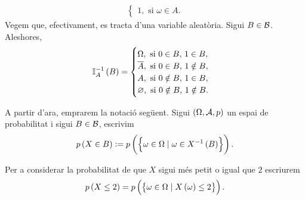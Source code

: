 \begin{example}
\begin{enumerate}[1.]
\begin{align*}
\begin{cases}
                    1, \text{ si } \omega\in A.
                \end{cases}
            \end{align*}
            Vegem que, efectivament, es tracta d'una variable aleatòria. Sigui $B\in\mathcal{B}$. Aleshores,
            \[
		    \mathbb{I}_A^{-1}\left( B\right)=\begin{cases}
                    \Omega, \text{ si } 0\in B,\, 1\in B,\\
                    \overline{A}, \text{ si } 0\in B,\, 1\notin B,\\
                    A, \text{ si } 0\notin B,\, 1\in B,\\
                    \varnothing, \text{ si } 0\notin B,\, 1\notin B.
                \end{cases}
            \]
    \end{enumerate}
\end{example}

\begin{obs}
    A partir d'ara, emprarem la notació següent. Sigui $(\Omega,\mathcal{A}, p)$ un espai de probabilitat i sigui $B\in\mathcal{B}$, escrivim
    \[
        p\left( X\in B\right):= p\left(\left\{\omega\in\Omega\mid\omega\in X^{-1}\left( B\right)\right\}\right).
    \]
\end{obs}

\begin{example}
    Per a considerar la probabilitat de que $X$ sigui més petit o igual que $2$ escriurem
    \[
      p\left( X\leq 2\right) = p\left(\left\{\omega\in\Omega\mid X\left(\omega\right)\leq 2\right\}\right).
    \]
\end{example}

